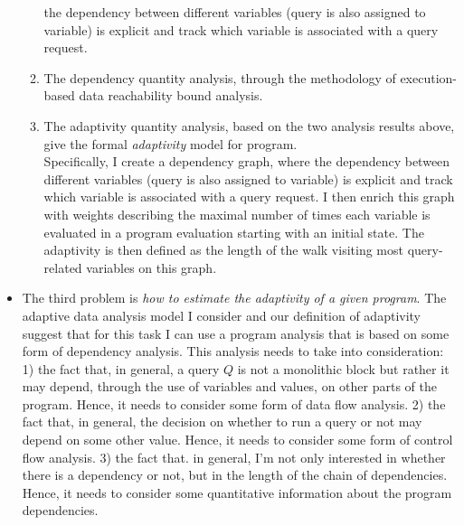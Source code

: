 \begin{itemize}
\begin{enumerate}
     the dependency between different variables (query is also assigned to variable) is explicit and track which variable is associated with a query request. 
   \item The dependency quantity analysis, through the methodology of execution-based data reachability bound analysis.
	\item The adaptivity quantity analysis, based on the two analysis results above, give the formal \emph{adaptivity} model 
   for program.
   \\
   Specifically, I create a dependency graph, where the dependency between different variables (query is also assigned to variable) is explicit and track which variable is associated with a query request. 
   I then enrich this graph with weights describing the maximal number of times each variable is evaluated in a program evaluation starting with an initial state. 
   The adaptivity is then defined as the length of the walk visiting most query-related variables on this graph. 
   \end{enumerate}
\item 
The third problem is \emph{how to estimate the adaptivity of a given program}. 
The adaptive data analysis model I consider and our definition of adaptivity suggest that for this task I can use a  program analysis that is based on some form of dependency analysis. This analysis needs to take into consideration:
1) the fact that, in general, a query $Q$ is not a monolithic block but rather it may depend, through the use of variables and values, on other parts of the program. 
Hence, it needs to consider some form of data flow analysis. 
2) the fact that, in general, the decision on whether to run a query or not may depend on some other value. Hence, 
 it needs to consider some form of control flow analysis.
3) the fact that. in general, I'm not only interested in whether there is a dependency or not, but in the length of the chain of dependencies. 
Hence, it needs to consider some quantitative information about the program dependencies. %

\end{itemize}
